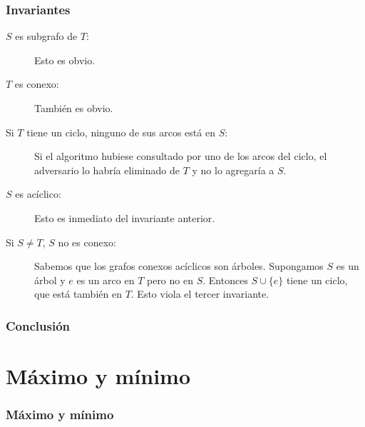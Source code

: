\documentclass[english, spanish, fleqn,%
hyperref = {colorlinks, urlcolor = blue}%
]{beamer}
\begin{document}
\begin{frame}
  \setcounter{beamerpauses}{2}
  \frametitle{Invariantes}

  \begin{description}
  \item[\boldmath\(S\) es subgrafo de \(T\)\unboldmath:]
    Esto es obvio.
  \item[\boldmath\(T\) es conexo\unboldmath:]
    También es obvio.
  \item[\boldmath Si \(T\) tiene un ciclo,
        ninguno de sus arcos está en \(S\)\unboldmath:]
    Si el algoritmo hubiese consultado por uno de los arcos del ciclo,
    el adversario lo habría eliminado de \(T\) y no lo agregaría a \(S\).
  \item[\boldmath\(S\) es acíclico\unboldmath:]
    Esto es inmediato del invariante anterior.
  \item[\boldmath Si \(S \ne T\), \(S\) no es conexo\unboldmath:]
    Sabemos que los grafos conexos acíclicos son árboles.
    Supongamos \(S\) es un árbol y \(e\) es un arco en \(T\) pero no en \(S\).
    Entonces \(S \cup \{ e \}\) tiene un ciclo,
    que está también en \(T\).
    Esto viola el tercer invariante.
  \end{description}
\end{frame}

\begin{frame}
  \setcounter{beamerpauses}{2}
  \frametitle{Conclusión}

\end{frame}

\section{Máximo y mínimo}

\begin{frame}
  \setcounter{beamerpauses}{2}
  \frametitle{Máximo y mínimo}

\end{frame}
\end{document}
